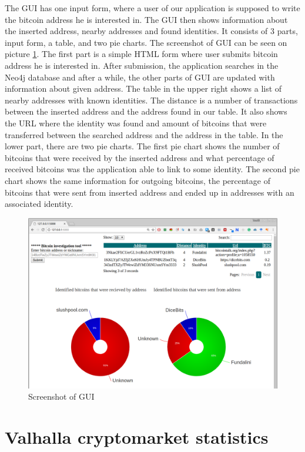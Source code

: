 \documentclass[
  digital, %
  table,   %
  lof,     %
  lot,     %
  oneside
]{fithesis3}
\begin{document}
The GUI has one input form, where a user of our application is supposed to write the bitcoin address he is interested in.
The GUI then shows information about the inserted address, nearby addresses and found identities.
It consists of 3 parts, input form, a table, and two pie charts. The screenshot of GUI can be seen on picture \ref{guiscreen}.
The first part is a simple HTML form where user submits bitcoin address he is interested in.
After submission, the application searches in the Neo4j database and after a while,
the other parts of GUI are updated with information about given address.
The table in the upper right shows a list of nearby addresses with known identities. The distance is a number of transactions
between the inserted address and the address found in our table. It also shows the URL where the identity was found
and amount of bitcoins that were transferred between the searched address and the address in the table.
In the lower part, there are two pie charts. The first pie chart shows the number of bitcoins that were received by the inserted address
and what percentage of received bitcoins was the application able to link to some identity.
The second pie chart shows the same information for outgoing bitcoins, the percentage of bitcoins that were sent from inserted address
and ended up in addresses with an associated identity.

\begin{figure}[!htb]
\hspace*{-1cm}
    \centering
    \includegraphics[width=1\textwidth]{shot}
    \caption{Screenshot of GUI}
    \label{guiscreen}
\end{figure}

\chapter{Valhalla cryptomarket statistics}
\label{stats}
\end{document}
